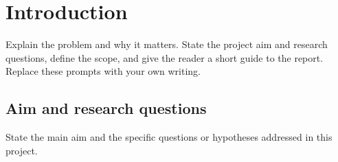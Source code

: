 \chapter{Introduction}

Explain the problem and why it matters. State the project aim and research questions, define the scope, and give the reader a short guide to the report. Replace these prompts with your own writing.

\section{Aim and research questions}

State the main aim and the specific questions or hypotheses addressed in this project.
